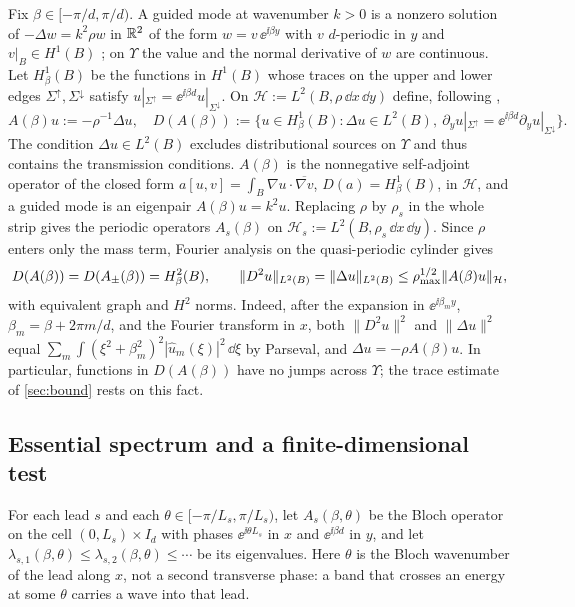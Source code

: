 Fix $\beta\in[-\pi/d,\pi/d)$. A guided mode at wavenumber $k>0$ is a nonzero
solution of $-\Delta w=k^2\rho w$ in $\mathbb{R}^2$ of the form
$w=v\,\ee^{\ii\beta y}$ with $v$ $d$-periodic in $y$ and $v|_B\in H^1(B)$
\cite{Fliss2013}; on $\Upsilon$ the value and the normal derivative of $w$ are
continuous. Let $H^1_\beta(B)$ be the functions in $H^1(B)$ whose traces on the
upper and lower edges $\Sigma^\uparrow,\Sigma^\downarrow$ satisfy
$u|_{\Sigma^\uparrow}=\ee^{\ii\beta d}u|_{\Sigma^\downarrow}$. On
$\mathcal H:=L^2(B,\rho\,\dd x\,\dd y)$ define, following
\cite[sect.~3]{Fliss2013},
\begin{equation}\label{eq:operator}
  A(\beta)u:=-\rho^{-1}\Delta u,\quad
  D(A(\beta)):=\bigl\{u\in H^1_\beta(B):\Delta u\in L^2(B),\
  \partial_y u|_{\Sigma^\uparrow}=\ee^{\ii\beta d}\partial_yu|_{\Sigma^\downarrow}\bigr\}.
\end{equation}
The condition $\Delta u\in L^2(B)$ excludes distributional sources on $\Upsilon$
and thus contains the transmission conditions. $A(\beta)$ is the nonnegative
self-adjoint operator of the closed form
$a[u,v]=\int_B\nabla u\cdot\overline{\nabla v}$, $D(a)=H^1_\beta(B)$, in
$\mathcal H$, and a guided mode is an eigenpair $A(\beta)u=k^2u$. Replacing
$\rho$ by $\rho_s$ in the whole strip gives the periodic operators $A_s(\beta)$
on $\mathcal H_s:=L^2(B,\rho_s\,\dd x\,\dd y)$. Since $\rho$ enters only the
mass term, Fourier analysis on the quasi-periodic cylinder gives
\begin{equation}\label{eq:domain-h2}
  D(A(\beta))=D(A_\pm(\beta))=H^2_\beta(B),\qquad
  \|D^2u\|_{L^2(B)}=\|\Delta u\|_{L^2(B)}\le\rho_{\max}^{1/2}\|A(\beta)u\|_{\mathcal H},
\end{equation}
with equivalent graph and $H^2$ norms. Indeed, after the expansion in
$\ee^{\ii\beta_my}$, $\beta_m=\beta+2\pi m/d$, and the Fourier transform in $x$,
both $\|D^2u\|^2$ and $\|\Delta u\|^2$ equal
$\sum_m\int(\xi^2+\beta_m^2)^2|\widehat u_m(\xi)|^2\,\dd\xi$ by Parseval, and
$\Delta u=-\rho A(\beta)u$. In particular, functions in
$D(A(\beta))$ have no jumps across $\Upsilon$; the trace estimate of
\cref{sec:bound} rests on this fact.

\subsection{Essential spectrum and a finite-dimensional test}\label{sec:gap-test}
For each lead $s$ and each $\theta\in[-\pi/L_s,\pi/L_s)$, let $A_s(\beta,\theta)$
be the Bloch operator
on the cell $(0,L_s)\times I_d$ with phases $\ee^{\ii\theta L_s}$ in $x$ and
$\ee^{\ii\beta d}$ in $y$, and let $\lambda_{s,1}(\beta,\theta)\le\lambda_{s,2}(\beta,\theta)
\le\cdots$ be its eigenvalues. Here $\theta$ is the Bloch wavenumber of the lead
along $x$, not a second transverse phase: a band that crosses an energy at some
$\theta$ carries a wave into that lead.


